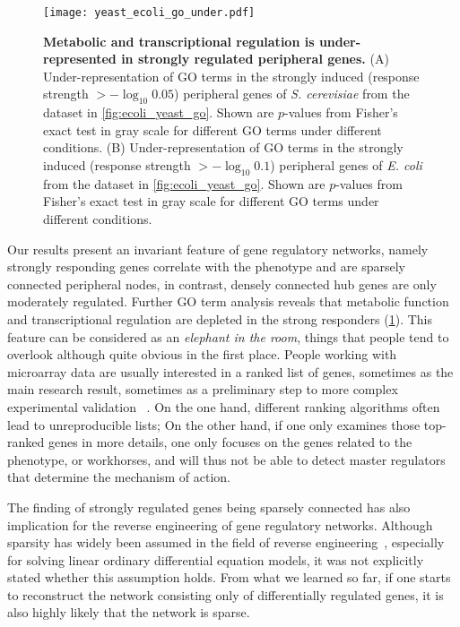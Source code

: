 \begin{figure}[!ht]
\begin{center}
\texttt{[image: yeast\_ecoli\_go\_under.pdf]}
\end{center}
\caption[GO term depletion of strongly regulated genes]{
{\bf Metabolic and transcriptional regulation is under-represented in 
strongly regulated peripheral genes.}
(A) Under-representation of GO
terms in the strongly induced (response strength $> -\log_{10}0.05$) 
peripheral genes of \emph{S. cerevisiae} from
the dataset in \ref{fig:ecoli_yeast_go}. Shown 
are $p$-values
from Fisher's exact test in gray scale for different GO terms under different 
conditions.
(B) Under-representation of GO terms
in the strongly induced (response strength $> -\log_{10}0.1$) peripheral genes 
of \emph{E. coli} from the dataset 
in \ref{fig:ecoli_yeast_go}. Shown are $p$-values
from Fisher's exact test in gray scale for different GO terms under different 
conditions. 
}
\label{fig:ecoli_yeast_go_under}
\end{figure}

Our results present an invariant feature of gene regulatory
networks, namely strongly responding genes correlate with
the phenotype and are sparsely connected peripheral nodes, 
in contrast, densely connected hub genes are only moderately
regulated. Further GO term analysis reveals that metabolic
function and transcriptional regulation are depleted in the
strong responders (\ref{fig:ecoli_yeast_go_under}).
This feature can be considered as an \emph{elephant in the room},
things that people tend to overlook although quite obvious
in the first place. People working with microarray data are
usually interested in a ranked list of genes, sometimes as the 
main research result, sometimes as a
preliminary step to more complex experimental validation~%
\citep{Boulesteix2009,Smyth2004}. On the one hand, different ranking
algorithms often lead to unreproducible lists; On the other
hand, if one only examines those top-ranked genes in more
details, one only focuses on the genes related to the phenotype,
or workhorses, and will thus not be able to detect master regulators
that determine the mechanism of action.

The finding of strongly regulated genes being sparsely connected
has also implication for the reverse engineering of gene regulatory
networks. Although sparsity has widely been assumed in the field
of reverse engineering~\citep{Yeung2002,Gardner2003}, especially
for solving linear ordinary differential equation models, it was
not explicitly stated whether this assumption holds. From what
we learned so far, if one starts to reconstruct the network consisting only of
differentially regulated genes, it is also highly likely that
the network is sparse.

